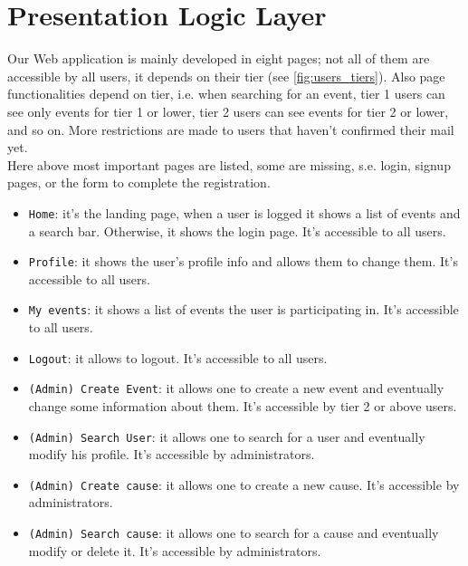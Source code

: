 \section{Presentation Logic Layer}

Our Web application is mainly developed in eight pages; not all of them are accessible by all users, it depends on their tier (see \ref{fig:users_tiers}). Also page functionalities depend on tier, i.e. when searching for an event, tier 1 users can see only events for tier 1 or lower, tier 2 users can see events for tier 2 or lower, and so on. More restrictions are made to users that haven't confirmed their mail yet.\\
Here above most important pages are listed, some are missing, s.e. login, signup pages, or the form to complete the registration.

\begin{itemize}
    \item \texttt{Home}: it's the landing page, when a user is logged it shows a list of events and a search bar. Otherwise, it shows the login page. It's accessible to all users.
    \item \texttt{Profile}: it shows the user's profile info and allows them to change them. It's accessible to all users.
    \item \texttt{My events}: it shows a list of events the user is participating in. It's accessible to all users.
    \item \texttt{Logout}: it allows to logout. It's accessible to all users.
    \item \texttt{(Admin) Create Event}: it allows one to create a new event and eventually change some information about them. It's accessible by tier 2 or above users.
    \item \texttt{(Admin) Search User}: it allows one to search for a user and eventually modify his profile. It's accessible by administrators.
    \item \texttt{(Admin) Create cause}: it allows one to create a new cause. It's accessible by administrators.
    \item \texttt{(Admin) Search cause}: it allows one to search for a cause and eventually modify or delete it. It's accessible by administrators.
\end{itemize}

